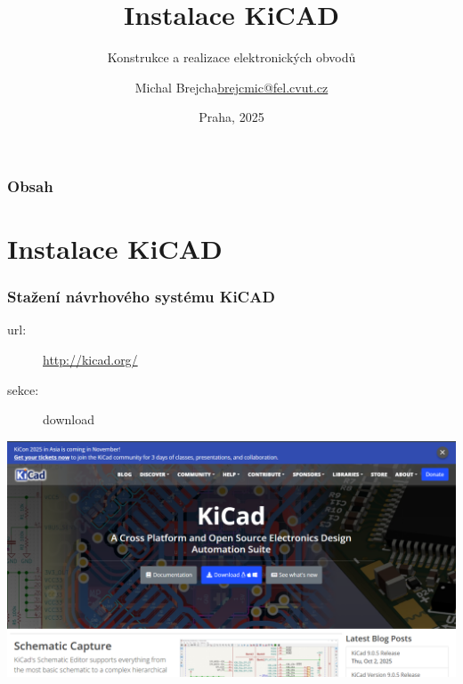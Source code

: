 \documentclass{beamer}
\title[Instalace KiCAD]{Instalace KiCAD}
\subtitle[KEO] {Konstrukce a realizace elektronických obvodů}
\author[Brejcha]{\texorpdfstring{Michal Brejcha\newline\url{brejcmic@fel.cvut.cz}}{Michal Brejcha}}
\institute[ČVUT]{ČVUT v Praze, FEL}
\date[Praha, 2025]{Praha, 2025}
\begin{document}
\frame{\titlepage}

\begin{frame}
\frametitle{Obsah} 
\tableofcontents
\end{frame}


\section{\texorpdfstring{Instalace KiCAD}{Instalace Kicad}}
	\begin{frame}
    \frametitle{Stažení návrhového systému KiCAD}
		
		\begin{description}
			\item[url:] \url{http://kicad.org/}
			\item[sekce:] download
		\end{description}
		
		\begin{center}
			\includegraphics[scale=0.3]{obr/kicad_url.png}
		\end{center}
	\end{frame}
\end{document}
